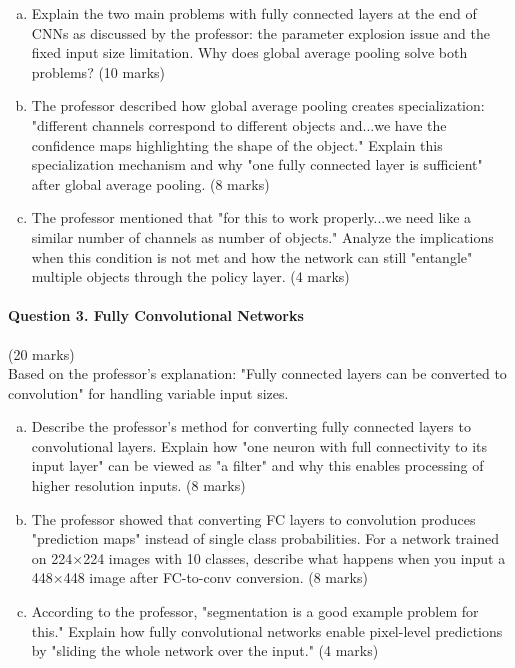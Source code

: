 \documentclass[12pt]{article}
\newcommand{\shortanswer}{\vspace{2cm}}
\newcommand{\mediumanswer}{\vspace{3cm}}
\begin{document}
\begin{enumerate}[(a)]
    \item Explain the two main problems with fully connected layers at the end of CNNs as discussed by the professor: the parameter explosion issue and the fixed input size limitation. Why does global average pooling solve both problems? \hfill (10 marks)
    
    \mediumanswer
    
    \item The professor described how global average pooling creates specialization: "different channels correspond to different objects and...we have the confidence maps highlighting the shape of the object." Explain this specialization mechanism and why "one fully connected layer is sufficient" after global average pooling. \hfill (8 marks)
    
    \mediumanswer
    
    \item The professor mentioned that "for this to work properly...we need like a similar number of channels as number of objects." Analyze the implications when this condition is not met and how the network can still "entangle" multiple objects through the policy layer. \hfill (4 marks)
    
    \shortanswer
\end{enumerate}

\newpage
\paragraph{Question 3. Fully Convolutional Networks}{\hfill (20 marks)}\\
Based on the professor's explanation: "Fully connected layers can be converted to convolution" for handling variable input sizes.

\begin{enumerate}[(a)]
    \item Describe the professor's method for converting fully connected layers to convolutional layers. Explain how "one neuron with full connectivity to its input layer" can be viewed as "a filter" and why this enables processing of higher resolution inputs. \hfill (8 marks)
    
    \mediumanswer
    
    \item The professor showed that converting FC layers to convolution produces "prediction maps" instead of single class probabilities. For a network trained on 224×224 images with 10 classes, describe what happens when you input a 448×448 image after FC-to-conv conversion. \hfill (8 marks)
    
    \mediumanswer
    
    \item According to the professor, "segmentation is a good example problem for this." Explain how fully convolutional networks enable pixel-level predictions by "sliding the whole network over the input." \hfill (4 marks)
    
    \shortanswer
\end{enumerate}
\end{document}

